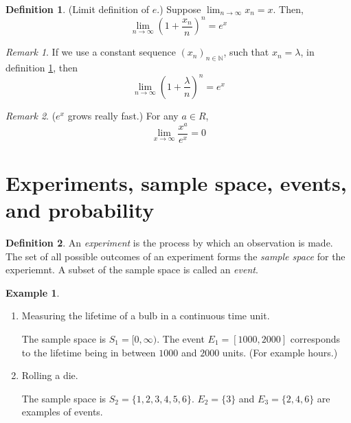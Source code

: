 \documentclass[11pt]{article}
\theoremstyle{definition}
\newtheorem{defn}{Definition}[section]
\newtheorem{eg}{Example}
\theoremstyle{remark}
\newtheorem{rem}{Remark}[section]
\newcommand{\parens}[1]{\left(#1\right)}
\newcommand{\N}{\mathbb{N}}
\begin{document}
\begin{defn}{(Limit definition of $e$.)}
    \label{def:limit-e}
    Suppose $\lim_{n\to\infty} x_n = x$. Then,
    \begin{equation}
        \label{eq:limit-e}
        \lim_{n\to\infty} {
            \parens{
                1 + \frac{x_n}{n}
            }^n
        }
        =
        e^x
    \end{equation}
\end{defn}

\begin{rem}
    If we use a constant sequence $(x_n)_{n\in\N}$, such that $x_n = \lambda$,
    in definition \ref{def:limit-e}, then
    \begin{equation*}
        \lim_{n\to\infty} {
            \parens{
                1 + \frac{\lambda}{n}
            }^n
        }
        =
        e^x
    \end{equation*}
\end{rem}

\begin{rem}{($e^x$ grows really fast.)}
    For any $a \in R$,
    \begin{equation*}
        \lim_{x\to\infty} {
            \frac{x^a}{e^x}
        }
        = 0
    \end{equation*}
\end{rem}

\section{Experiments, sample space, events, and probability}

\begin{defn}
    An \emph{experiment} is the process by which an observation is made. The
    set of all possible outcomes of an experiment forms the \emph{sample space}
    for the experiemnt. A subset of the sample space is called an \emph{event}.
\end{defn}

\begin{eg} ~

    \begin{enumerate}
        \item Measuring the lifetime of a bulb in a continuous time unit.

            The sample space is $S_1 = [0, \infty)$.
            The event $E_1 = [1000, 2000]$ corresponds to the lifetime being in
            between $1000$ and $2000$ units. (For example hours.)

        \item Rolling a die.

            The sample space is $S_2 = \{1,2,3,4,5,6\}$.
            $E_2 = \{3\}$ and $E_3 = \{2,4,6\}$ are examples of events.
    \end{enumerate}
\end{eg}
\end{document}
